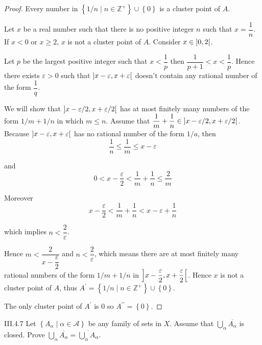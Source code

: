 \begin{proof}
	Every number in \( \left\{ 1/n \mid n \in \mathbb{Z}^{+} \right\} \cup \left\{0\right\} \) is a cluster point of \(A\).

	Let \(x\) be a real number such that there is no positive integer \(n\) such that \( x = \dfrac{1}{n} \). If \( x < 0 \) or \( x \ge 2 \), \( x \) is not a cluster point of \(A\). Consider \( x \in \left\rbrack{0, 2}\right\lbrack \).

	Let \(p\) be the largest positive integer such that \( x < \dfrac{1}{p} \) then \( \dfrac{1}{p+1} < x < \dfrac{1}{p} \). Hence there exists \( \varepsilon > 0 \) such that \( \left\rbrack{x - \varepsilon, x + \varepsilon}\right\lbrack \) doesn't contain any rational number of the form \( \dfrac{1}{q} \).

	We will show that \( \left\rbrack{x - \varepsilon/2, x + \varepsilon/2}\right\lbrack \) has at most finitely many numbers of the form \( 1/m + 1/n \) in which \( m \le n \). Assume that \( \dfrac{1}{m} + \dfrac{1}{n} \in \left\rbrack{x - \varepsilon/2, x + \varepsilon/2}\right\lbrack \). Because \( \left\rbrack{x - \varepsilon, x + \varepsilon}\right\lbrack \) has no rational number of the form \(1/a\), then
	\[ \dfrac{1}{n} \le \dfrac{1}{m} \le x - \varepsilon \]

	and
	\[ 0 < x - \dfrac{\varepsilon}{2} < \dfrac{1}{m} + \dfrac{1}{n} \le \dfrac{2}{m} \]

	Moreover
	\[
		x - \dfrac{\varepsilon}{2} < \dfrac{1}{m} + \dfrac{1}{n} < x - \varepsilon + \dfrac{1}{n}
	\]

	which implies \( n < \dfrac{2}{\varepsilon} \).

	Hence \( m < \dfrac{2}{x - \dfrac{\varepsilon}{2}} \) and \( n < \dfrac{2}{\varepsilon} \), which means there are at most finitely many rational numbers of the form \( 1/m + 1/n \) in \( \left\rbrack{x - \dfrac{\varepsilon}{2}, x + \dfrac{\varepsilon}{2}}\right\lbrack \). Hence \( x \) is not a cluster point of \(A\), thus \( A^{\prime} = \left\{ 1/n \mid n \in \mathbb{Z}^{+} \right\} \cup \left\{0\right\} \).

	The only cluster point of \(A^{\prime}\) is 0 so \( A^{\prime\prime} = \left\{0\right\} \).
\end{proof}

\begin{problem}{III.4.7}
Let \( \left\{ A_{\alpha} \mid \alpha \in \mathscr{A} \right\} \) be any family of sets in \(X\). Assume that \( \bigcup_{\alpha} \overline{A_{\alpha}} \) is closed. Prove \( \bigcup_{\alpha} \overline{A_{\alpha}} = \overline{\bigcup_{\alpha} A_{\alpha}} \).
\end{problem}

